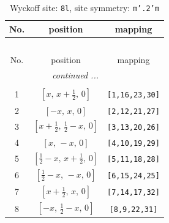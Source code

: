 \documentclass[fleqn,8pt]{jsarticle}
\begin{document}
\begin{longtable}{ccc}
\caption{Wyckoff site: {\tt 8l}, site symmetry: {\tt m'.2'm}}
 \\
 \hline \hline
No. & position & mapping \\ \hline \endfirsthead

\multicolumn{2}{l}{\tablename\ \thetable{}} \\
 \hline \hline
No. & position & mapping \\ \hline \endhead

 \hline \hline
\multicolumn{2}{r}{\footnotesize\it continued ...} \\ \endfoot

 \hline \hline
\multicolumn{2}{r}{} \\ \endlastfoot

1 & $\left[ x,\, x + \frac{1}{2},\, 0 \right]$ & {\tt [1,16,23,30]} \\ \hline
2 & $\left[ - x,\, x,\, 0 \right]$ & {\tt [2,12,21,27]} \\ \hline
3 & $\left[ x + \frac{1}{2},\, \frac{1}{2} - x,\, 0 \right]$ & {\tt [3,13,20,26]} \\ \hline
4 & $\left[ x,\, - x,\, 0 \right]$ & {\tt [4,10,19,29]} \\ \hline
5 & $\left[ \frac{1}{2} - x,\, x + \frac{1}{2},\, 0 \right]$ & {\tt [5,11,18,28]} \\ \hline
6 & $\left[ \frac{1}{2} - x,\, - x,\, 0 \right]$ & {\tt [6,15,24,25]} \\ \hline
7 & $\left[ x + \frac{1}{2},\, x,\, 0 \right]$ & {\tt [7,14,17,32]} \\ \hline
8 & $\left[ - x,\, \frac{1}{2} - x,\, 0 \right]$ & {\tt [8,9,22,31]} \\
\end{longtable}
\renewcommand{\arraystretch}{1.2}
\end{document}
